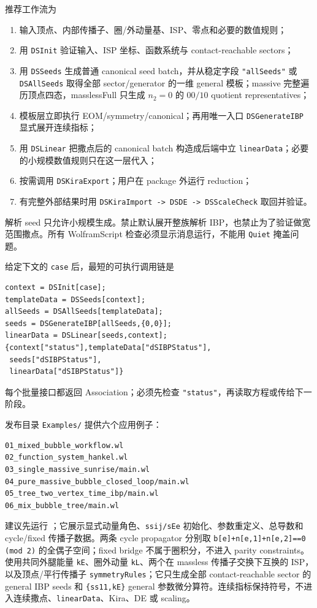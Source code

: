 ﻿\documentclass[a4paper,11pt]{article}
\begin{document}
推荐工作流为
\begin{enumerate}
  \item 输入顶点、内部传播子、圈/外动量基、ISP、零点和必要的数值规则；
  \item 用 \texttt{DSInit} 验证输入、ISP 坐标、函数系统与 contact-reachable sectors；
  \item 用 \texttt{DSSeeds} 生成普通 canonical seed batch，并从稳定字段 \texttt{"allSeeds"} 或 \texttt{DSAllSeeds} 取得全部 sector/generator 的一维 general 模板；massive 完整遍历顶点四态，masslessFull 只生成 $n_2=0$ 的 $00/10$ quotient representatives；
  \item 模板层立即执行 EOM/symmetry/canonical；再用唯一入口 \texttt{DSGenerateIBP} 显式展开连续指标；
  \item 用 \texttt{DSLinear} 把撒点后的 canonical batch 构造成后端中立 \texttt{linearData}；必要的小规模数值规则只在这一层代入；
  \item 按需调用 \texttt{DSKiraExport}；用户在 package 外运行 reduction；
  \item 有完整外部结果时用 \texttt{DSKiraImport -> DSDE -> DSScaleCheck} 取回并验证。
\end{enumerate}

\begin{proofbox}
解析 seed 只允许小规模生成。禁止默认展开整族解析 IBP，也禁止为了验证做宽范围撒点。所有 WolframScript 检查必须显示消息运行，不能用 \texttt{Quiet} 掩盖问题。
\end{proofbox}

给定下文的 \texttt{case} 后，最短的可执行调用链是
\begin{verbatim}
context = DSInit[case];
templateData = DSSeeds[context];
allSeeds = DSAllSeeds[templateData];
seeds = DSGenerateIBP[allSeeds,{0,0}];
linearData = DSLinear[seeds,context];
{context["status"],templateData["dSIBPStatus"],
 seeds["dSIBPStatus"],
 linearData["dSIBPStatus"]}
\end{verbatim}
每个批量接口都返回 Association；必须先检查 \texttt{"status"}，再读取方程或传给下一阶段。

发布目录 \texttt{Examples/} 提供六个应用例子：
\begin{verbatim}
01_mixed_bubble_workflow.wl
02_function_system_hankel.wl
03_single_massive_sunrise/main.wl
04_pure_massive_bubble_closed_loop/main.wl
05_tree_two_vertex_time_ibp/main.wl
06_mix_bubble_tree/main.wl
\end{verbatim}
建议先运行 ；它展示显式动量角色、\texttt{ssij/sEe} 初始化、参数重定义、总导数和 cycle/fixed 传播子数据。两条 cycle propagator 分别取
\texttt{b[e]+n[e,1]+n[e,2]==0 (mod 2)} 的全偶子空间；fixed bridge 不属于圈积分，不进入 parity constraints。 使用共同外腿能量 \texttt{kE}、圈外动量 \texttt{kL}、两个在 massless 传播子交换下互换的 ISP，以及顶点/平行传播子 \texttt{symmetryRules}；它只生成全部 contact-reachable sector 的 general IBP seeds 和 \texttt{\{ss11,kE\}} general 参数微分算符。连续指标保持符号，不进入连续撒点、\texttt{linearData}、Kira、DE 或 scaling。
\end{document}
